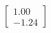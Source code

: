 \documentclass[preview]{standalone}
\begin{document}
\begin{align*}
\begin{bmatrix} 1.00 \\ -1.24 \end{bmatrix}
\end{align*}
\end{document}
